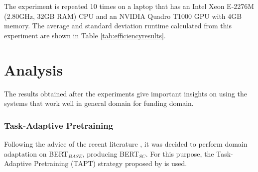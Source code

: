 \documentclass{report}
\theoremstyle{definition}
\theoremstyle{remark}
\begin{document}
The experiment is repeated 10 times on a laptop that has an Intel Xeon E-2276M (2.80GHz, 32GB RAM) CPU and an NVIDIA Quadro T1000 GPU with 4GB memory. The average and standard deviation runtime calculated from this experiment are shown in Table \ref{tab:efficiencyresults}. 
    

\newpage
\section{Analysis}
\label{sec:EvalAnalysis}

The results obtained after the experiments give important insights on using the systems that work well in general domain for funding domain. 

\subsubsection{Task-Adaptive Pretraining}
Following the advice of the recent literature \textcolor{red}{\cite{}}, it was decided to perform domain adaptation on BERT$_{BASE}$, producing BERT$_{SC}$. For this purpose, the Task-Adaptive Pretraining (TAPT) strategy proposed by \cite{DontStop} is used. 
\end{document}

